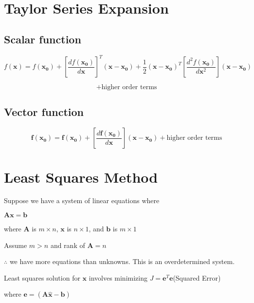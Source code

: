 \documentclass[fleqn]{article}
\begin{document}
	\section{Taylor Series Expansion}
	
	\subsection{Scalar function}
	
	\begin{equation*}
		f(\mathbf{x}) = f(\mathbf{x_0}) + \left[\frac{df(\mathbf{x_0})}{d\mathbf{x}}\right]^T(\mathbf{x} - \mathbf{x_0}) + \frac{1}{2}(\mathbf{x}-\mathbf{x_0})^T\left[\frac{d^2f(\mathbf{x_0})}{d\mathbf{x}^2}\right](\mathbf{x} - \mathbf{x_0}) 
	\end{equation*}
	
	\begin{equation*}
		+ \text{higher order terms}
	\end{equation*}
	
	\subsection{Vector function}
	
	\begin{equation*}
		\mathbf{f}(\mathbf{x_0}) = \mathbf{f}(\mathbf{x_0}) + \left[\frac{d\mathbf{f}(\mathbf{x_0})}{d\mathbf{x}}\right](\mathbf{x} - \mathbf{x_0}) + \text{higher order terms}
	\end{equation*}
	
	\section{Least Squares Method}
	
	Suppose we have a system of linear equations where
	
	$\mathbf{Ax} = \mathbf{b}$
	
	where $\mathbf{A}$ is $m \times n$, $\mathbf{x}$ is $n \times 1$, and $\mathbf{b}$ is $m \times 1$
	
	Assume $m > n$ and rank of $\mathbf{A} = n$
	
	$\therefore$ we have more equations than unknowns. This is an overdetermined system.
	
	Least squares solution for $\mathbf{x}$ involves minimizing $J = \mathbf{e}^T\mathbf{e}$\quad (Squared Error)
	
	where $\mathbf{e} = (\mathbf{A\hat{x}} - \mathbf{b})$
	
\end{document}
